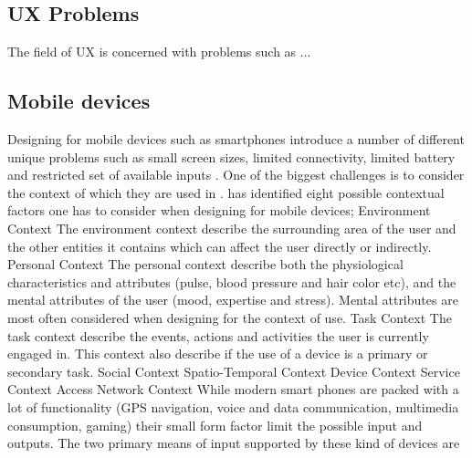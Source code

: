 \subsection{UX Problems}
The field of UX is concerned with problems such as ... 

\subsection{Mobile devices}
Designing for mobile devices such as smartphones introduce a number of different unique problems such as small screen sizes, limited connectivity, limited battery and restricted set of available inputs \cite{Zhang2005}. One of the biggest challenges is to consider the context of which they are used in \cite{Harrison2013} \cite{Korhonen2010} \cite{Zhang2005}. \cite{Korhonen2010} has identified eight possible contextual factors one has to consider when designing for mobile devices;
Environment Context The environment context describe the surrounding area of the user and the other entities it contains which can affect the user directly or indirectly.
Personal Context The personal context describe both the physiological characteristics and attributes (pulse, blood pressure and hair color etc), and the mental attributes of the user (mood, expertise and stress). Mental attributes are most often considered when designing for the context of use.
Task Context The task context describe the events, actions and activities the user is currently engaged in. This context also describe if the use of a device is a primary or secondary task.
Social Context Spatio-Temporal Context Device Context
Service Context
Access Network Context
While modern smart phones are packed with a lot of functionality (GPS navigation, voice and data communication, multimedia consumption, gaming) their small form factor limit the possible input and outputs. The two primary means of input supported by these kind of devices are
